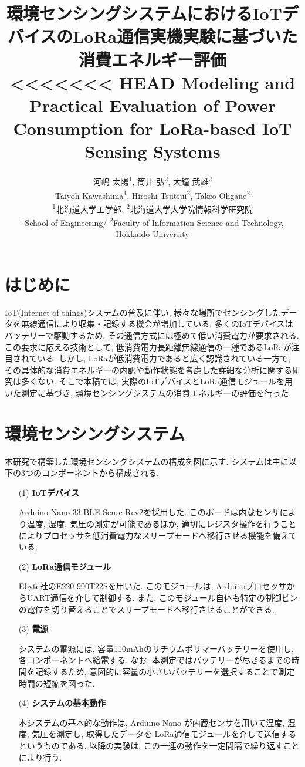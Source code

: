 \documentclass[lualatex, twocolumn]{ltjsarticle}
\title{{\bfseries 環境センシングシステムにおけるIoTデバイスのLoRa通信実機実験に基づいた消費エネルギー評価}\\
<<<<<<< HEAD
\large{Modeling and Practical Evaluation of Power Consumption for LoRa-based IoT Sensing Systems}}
\author{
    河嶋 太陽\textsuperscript{1},
    筒井 弘\textsuperscript{2},
    大鐘 武雄\textsuperscript{2}
    \\
    \normalsize
    Taiyoh Kawashima\textsuperscript{1},
    Hiroshi Tsutsui\textsuperscript{2},
    Takeo Ohgane\textsuperscript{2}
    \\
    \textsuperscript{1}北海道大学工学部,
    \textsuperscript{2}北海道大学大学院情報科学研究院
    \\
    \normalsize
    \textsuperscript{1}School of Engineering/ \textsuperscript{2}Faculty of Information Science and Technology, Hokkaido University
}
\date{}
\begin{document}
\maketitle


\section{はじめに}
 IoT(Internet of things)システムの普及に伴い, 様々な場所でセンシングしたデータを無線通信により収集・記録する機会が増加している. 
多くのIoTデバイスはバッテリーで駆動するため, その通信方式には極めて低い消費電力が要求される. 
この要求に応える技術として,  低消費電力長距離無線通信の一種であるLoRaが注目されている. 
しかし, LoRaが低消費電力であると広く認識されている一方で, その具体的な消費エネルギーの内訳や動作状態を考慮した詳細な分析に関する研究は多くない. 
そこで本稿では,  実際のIoTデバイスとLoRa通信モジュールを用いた測定に基づき, 環境センシングシステムの消費エネルギーの評価を行った. 


\section{環境センシングシステム}
 本研究で構築した環境センシングシステムの構成を図に示す. システムは主に以下の3つのコンポーネントから構成される.
\begin{enumerate}
    \item[(1)]\textbf{IoTデバイス}

    Arduino Nano 33 BLE Sense Rev2を採用した. このボードは内蔵センサにより温度, 湿度, 気圧の測定が可能であるほか, 
    適切にレジスタ操作を行うことによりプロセッサを低消費電力なスリープモードへ移行させる機能を備えている.

    \item[(2)]\textbf{LoRa通信モジュール}

    Ebyte社のE220-900T22Sを用いた. このモジュールは, ArduinoプロセッサからUART通信を介して制御する. 
    また, このモジュール自体も特定の制御ピンの電位を切り替えることでスリープモードへ移行させることができる. 

    \item[(3)]\textbf{電源}

    システムの電源には, 容量110mAhのリチウムポリマーバッテリーを使用し, 各コンポーネントへ給電する.
    なお, 本測定ではバッテリーが尽きるまでの時間を記録するため, 意図的に容量の小さいバッテリーを選択することで測定時間の短縮を図った.

    \item [(4)]\textbf{システムの基本動作}

    本システムの基本的な動作は, Arduino Nano が内蔵センサを用いて温度, 湿度, 気圧を測定し, 取得したデータを
    LoRa通信モジュールを介して送信するというものである. 
    以降の実験は, この一連の動作を一定間隔で繰り返すことにより行う. 
\end{enumerate}
\end{document}
